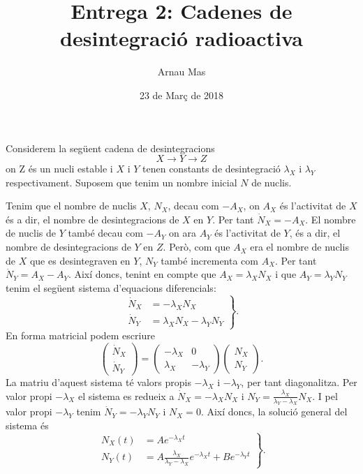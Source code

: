 \documentclass[12pt]{article}
\title{\textsf{\textbf{Entrega 2}: Cadenes de desintegració radioactiva}}
\author{\textsf{Arnau Mas}}
\date{\textsf{23 de Març de 2018}}
\begin{document}
\maketitle
Considerem la següent cadena de desintegracions
\begin{equation*}
	X \to Y \to Z
\end{equation*}
on Z és un nucli estable i \( X \) i \( Y \) tenen constants de desintegració \( \lambda_X \) i \( \lambda_Y \) respectivament. Suposem que tenim un nombre inicial \( N \) de nuclis.

Tenim que el nombre de nuclis \( X \), \( N_X \), decau com \( -A_X \), on \( A_X \) és l'activitat de \( X \) és a dir, el nombre de desintegracions de \( X \) en \( Y \). Per tant \( \dot{N}_X = -A_X \). El nombre de nuclis de \( Y \) també decau com \( -A_Y \) on ara \( A_Y \) és l'activitat de \( Y \), és a dir, el nombre de desintegracions de \( Y \) en \( Z \). Però, com que \( A_X \) era el nombre de nuclis de \( X \) que es desintegraven en \( Y \), \( N_Y \) també incrementa com \( A_X \). Per tant \( \dot{N}_Y = A_X - A_Y \). Així doncs, tenint en compte que \( A_X = \lambda_X N_X \) i que \( A_Y = \lambda_Y N_Y \) tenim el següent sistema d'equacions diferencials:
\begin{equation} \label{eq:eqs diferencials}
	\left.
		\begin{aligned}
			\dot{N}_X &= -\lambda_X N_X \\
			\dot{N}_Y & = \lambda_X N_X - \lambda_Y N_Y
		\end{aligned}	
	\right\}.
\end{equation}
En forma matricial podem escriure
\begin{equation} \label{eq:eqs diferencials matriu}
	\begin{pmatrix}
		\dot{N}_X \\
		\dot{N}_Y 
	\end{pmatrix}
	=
	\begin{pmatrix}
		- \lambda_X & 0 \\
		\lambda_X & -\lambda_Y 
	\end{pmatrix}
	\begin{pmatrix}
		N_X \\
		N_Y
	\end{pmatrix}.
\end{equation}
La matriu d'aquest sistema té valors propis \( -\lambda_X \) i \( -\lambda_Y \), per tant diagonalitza. Per valor propi \( -\lambda_X \) el sistema es redueix a \( \dot{N}_X = -\lambda_X N_X \) i \( N_Y = \frac{\lambda_X}{\lambda_Y - \lambda_X} N_X \). I pel valor propi \( -\lambda_Y \) tenim \( \dot{N}_Y = -\lambda_Y N_Y \) i \( N_X = 0 \). Així doncs, la solució general del sistema és 
\begin{equation} \label{eq:sol general}
\left.
	\begin{aligned}
		N_X(t) & = Ae^{-\lambda_X t} \\
		N_Y(t) & = A\frac{\lambda_X}{\lambda_Y - \lambda_X}e^{-\lambda_X t} + Be^{-\lambda_Y t}
	\end{aligned}
\right\}.
\end{equation}
\end{document}
